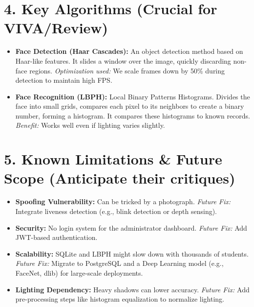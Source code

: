 \documentclass[10pt]{article}
\begin{document}
\section*{4. Key Algorithms (Crucial for VIVA/Review)}
\begin{itemize}[leftmargin=*, parsep=0pt, itemsep=3pt]
    \item \textbf{Face Detection (Haar Cascades):} An object detection method based on Haar-like features. It slides a window over the image, quickly discarding non-face regions. \textit{Optimization used:} We scale frames down by 50\% during detection to maintain high FPS.
    \item \textbf{Face Recognition (LBPH):} Local Binary Patterns Histograms. Divides the face into small grids, compares each pixel to its neighbors to create a binary number, forming a histogram. It compares these histograms to known records. \textit{Benefit:} Works well even if lighting varies slightly.
\end{itemize}

\section*{5. Known Limitations \& Future Scope (Anticipate their critiques)}
\begin{itemize}[leftmargin=*, parsep=0pt, itemsep=3pt]
    \item \textbf{Spoofing Vulnerability:} Can be tricked by a photograph. \textit{Future Fix:} Integrate liveness detection (e.g., blink detection or depth sensing).
    \item \textbf{Security:} No login system for the administrator dashboard. \textit{Future Fix:} Add JWT-based authentication.
    \item \textbf{Scalability:} SQLite and LBPH might slow down with thousands of students. \textit{Future Fix:} Migrate to PostgreSQL and a Deep Learning model (e.g., FaceNet, dlib) for large-scale deployments.
    \item \textbf{Lighting Dependency:} Heavy shadows can lower accuracy. \textit{Future Fix:} Add pre-processing steps like histogram equalization to normalize lighting.
\end{itemize}
\end{document}

